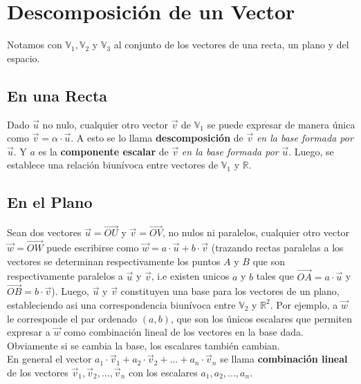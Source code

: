 \documentclass[11pt,a4paper]{article}
\begin{document}
\section{Descomposici\'on de un Vector}
\noindent Notamos con $\mathbb{V}_1,\mathbb{V}_2$ y $\mathbb{V}_3$ al conjunto de los vectores de una recta, un plano y del espacio.
\subsection{En una Recta}
\noindent Dado $\overrightarrow{u}$ no nulo, cualquier otro vector $\overrightarrow{v}$ de $\mathbb{V}_1$ se puede expresar de manera \'unica como $\overrightarrow{v} = \alpha \cdot \overrightarrow{u}$. A esto se lo llama \textbf{descomposici\'on} de $\overrightarrow{v}$ \textit{en la base formada por} $\overrightarrow{u}$. Y $a$ es la \textbf{componente escalar} de $ \overrightarrow{v}$ \textit{en la base formada por} $\overrightarrow{u}$. Luego, se establece una relaci\'on biun\'ivoca entre vectores de $\mathbb{V}_1$ y $\mathbb{R}$.
\subsection{En el Plano}
Sean dos vectores $\overrightarrow{u} = \overrightarrow{OU}$ y $\overrightarrow{v} = \overrightarrow{OV}$, no nulos ni paralelos, cualquier otro vector $\overrightarrow{w} = \overrightarrow{OW}$ puede escribirse como $\overrightarrow{w} = a \cdot \overrightarrow{u} + b \cdot \overrightarrow{v}$ (trazando rectas paralelas a los vectores se determinan respectivamente los puntos $A$ y $B$ que son respectivamente paralelos a $\overrightarrow{u}$ y $\overrightarrow{v}$, i.e existen unicos $a$ y $b$ tales que $\overrightarrow{OA} = a \cdot \overrightarrow{u}$ y $\overrightarrow{OB} = b \cdot \overrightarrow{v}$). Luego, $\overrightarrow{u}$ y $\overrightarrow{v}$ constituyen una base para los vectores de un plano, estableciendo asi una correspondencia biun\'ivoca entre $\mathbb{V}_2$ y $\mathbb{R}^2$. Por ejemplo, a $\overrightarrow{w}$ le corresponde el par ordenado $(a,b)$, que son los \'unicos escalares que permiten expresar a $\overrightarrow{w}$ como combinaci\'on lineal de los vectores en la base dada. Obviamente si se cambia la base, los escalares tambi\'en cambian.\\

\noindent En general el vector $a_1\cdot\overrightarrow{v}_1 + a_2\cdot\overrightarrow{v}_2 + ... + a_n\cdot\overrightarrow{v}_n$ se llama \textbf{combinaci\'on lineal} de los vectores $\overrightarrow{v}_1, \overrightarrow{v}_2, ..., \overrightarrow{v}_n$ con los escalares $a_1, a_2, ..., a_n$.
\end{document}
